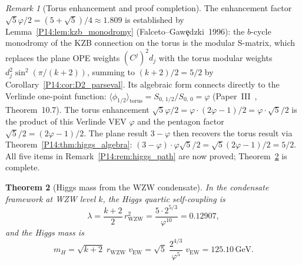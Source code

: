 \documentclass[11pt,a4paper]{article}
\newtheorem{theorem}{Theorem}[section]
\theoremstyle{definition}
\theoremstyle{remark}
\newtheorem{remark}[theorem]{Remark}
\newcommand{\vp}{\varphi}
\newcommand{\vEW}{v_{\mathrm{EW}}}
\newcommand{\mH}{m_H}
\begin{document}
\begin{remark}[Torus enhancement and proof completion]
\label{P14:rem:torus_enhancement}
The enhancement factor $\sqrt{5}\vp/2 = (5+\sqrt{5})/4 \approx 1.809$
is established by Lemma~\ref{P14:lem:kzb_monodromy}
(Falceto--Gaw\c{e}dzki~1996): the $b$-cycle monodromy of the
KZB connection on the torus is the modular S-matrix, which replaces
the plane OPE weights $(C^j)^2 d_j$ with the torus modular weights
$d_j^2\sin^2(\pi/(k+2))$, summing to $(k+2)/2 = 5/2$ by
Corollary~\ref{P14:cor:D2_parseval}.
Its algebraic form connects directly to the Verlinde one-point function:
$\langle\phi_{1/2}\rangle_{\mathrm{torus}} = S_{0,\,1/2}/S_{0,\,0} = \vp$
(Paper~III~\cite{Paper3}, Theorem~10.7).
The torus enhancement
$\sqrt{5}\vp/2 = \vp\cdot(2\vp-1)/2 = \vp\cdot\sqrt{5}/2$
is the product of this Verlinde VEV $\vp$ and the pentagon factor
$\sqrt{5}/2 = (2\vp-1)/2$.
The plane result $3-\vp$ then recovers the torus result via
Theorem~\ref{P14:thm:higgs_algebra}: $(3-\vp)\cdot\vp\sqrt{5}/2
= \sqrt{5}(2\vp-1)/2 = 5/2$.
All five items in Remark~\ref{P14:rem:higgs_path} are now proved;
Theorem~\ref{P14:thm:higgs} is complete.
\end{remark}

\begin{theorem}[Higgs mass from the WZW condensate]
\label{P14:thm:higgs}
In the condensate framework at WZW level $k$, the Higgs quartic
self-coupling is
\begin{equation}
  \boxed{\lambda
  = \frac{k+2}{2}\,r_{\mathrm{WZW}}^2
  = \frac{5\cdot 2^{5/3}}{\vp^{10}}
  = 0.12907,}
  \label{P14:eq:lambda_higgs}
\end{equation}
and the Higgs mass is
\begin{equation}
  \boxed{\mH = \sqrt{k+2}\;r_{\mathrm{WZW}}\;\vEW
  = \sqrt{5}\;\frac{2^{4/3}}{\vp^5}\;\vEW
  = 125.10\,\mathrm{GeV}.}
  \label{P14:eq:mH_formula}
\end{equation}
\end{theorem}
\end{document}
